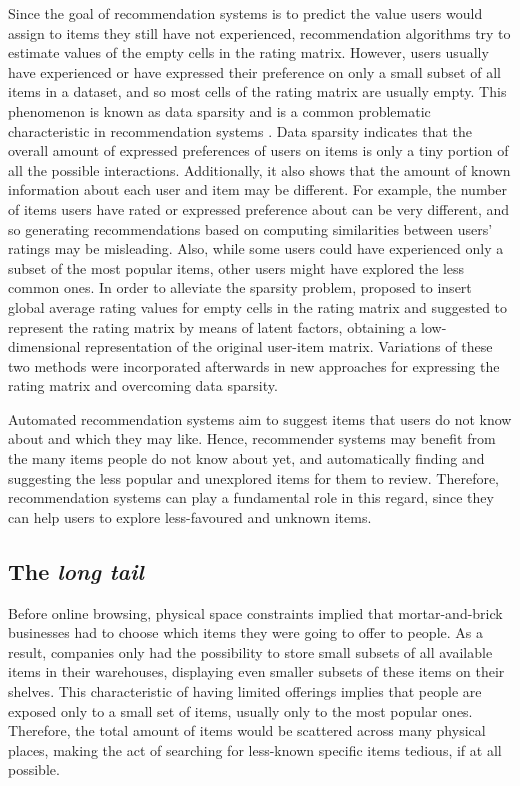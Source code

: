 Since the goal of recommendation systems is to predict the value users would assign to items they still have not experienced,  recommendation algorithms try to estimate  values of the empty cells in the rating matrix.
However,  users usually have experienced or have expressed their preference on only a small subset of all items in a dataset, and so most cells of the rating matrix are usually empty. This phenomenon is known as data sparsity and is a common problematic characteristic in recommendation systems \autocite{goldberg01eigentaste}. 
Data sparsity indicates that the overall amount of expressed preferences of users on items is only a tiny portion of all the possible interactions. Additionally, it also shows that the amount of known information about each user and item may be different. 
For example, the number of items users have rated or expressed preference about can be very different, and so generating recommendations based on computing similarities between users' ratings may be misleading.
Also, while some users could have experienced only a subset of the most popular items, other users might have explored the less common ones. 
In order to alleviate the sparsity problem, \textcite{herlocker99algorithmic} proposed to insert global average rating values for empty cells in the rating matrix and \textcite{sarwar00application} suggested to represent the rating matrix by means of latent factors, obtaining a low-dimensional representation of the original user-item matrix. Variations of these two methods were incorporated afterwards in new approaches for expressing the rating matrix and overcoming data sparsity.


Automated recommendation systems aim to suggest items that users do not know about and which they may like. 
Hence, recommender systems may benefit from the many items people do not know about yet, and automatically finding and  suggesting the less popular and unexplored  items for them to review. 
Therefore, recommendation systems can play a fundamental role in this regard, since they can help users to explore less-favoured and unknown items. 


\subsection{The \emph{long tail}}
Before online browsing, physical space constraints implied that mortar-and-brick businesses had to choose which items they were going to offer to people.
As a result, companies only had the possibility to store small subsets of all available items in their warehouses, displaying even smaller subsets of these items on their shelves. 
This characteristic of having limited offerings implies that people are exposed only to a small set of items, usually only to the most popular ones. 
Therefore, the total amount of items would be scattered across many physical places, making the act of searching for less-known specific items tedious, if at all possible.


